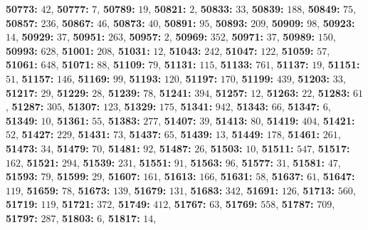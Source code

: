 \textsf{\bfseries 50773:} $42$, \textsf{\bfseries 50777:} $7$, \textsf{\bfseries 50789:} $19$, \textsf{\bfseries 50821:} $2$, \textsf{\bfseries 50833:} $33$, \textsf{\bfseries 50839:} $188$, \textsf{\bfseries 50849:} $75$, \textsf{\bfseries 50857:} $236$, \textsf{\bfseries 50867:} $46$, \textsf{\bfseries 50873:} $40$, \textsf{\bfseries 50891:} $95$, \textsf{\bfseries 50893:} $209$, \textsf{\bfseries 50909:} $98$, \textsf{\bfseries 50923:} $14$, \textsf{\bfseries 50929:} $37$, \textsf{\bfseries 50951:} $263$, \textsf{\bfseries 50957:} $2$, \textsf{\bfseries 50969:} $352$, \textsf{\bfseries 50971:} $37$, \textsf{\bfseries 50989:} $150$, \textsf{\bfseries 50993:} $628$, \textsf{\bfseries 51001:} $208$, \textsf{\bfseries 51031:} $12$, \textsf{\bfseries 51043:} $242$, \textsf{\bfseries 51047:} $122$, \textsf{\bfseries 51059:} $57$, \textsf{\bfseries 51061:} $648$, \textsf{\bfseries 51071:} $88$, \textsf{\bfseries 51109:} $79$, \textsf{\bfseries 51131:} $115$, \textsf{\bfseries 51133:} $761$, \textsf{\bfseries 51137:} $19$, \textsf{\bfseries 51151:} $51$, \textsf{\bfseries 51157:} $146$, \textsf{\bfseries 51169:} $99$, \textsf{\bfseries 51193:} $120$, \textsf{\bfseries 51197:} $170$, \textsf{\bfseries 51199:} $439$, \textsf{\bfseries 51203:} $33$, \textsf{\bfseries 51217:} $29$, \textsf{\bfseries 51229:} $28$, \textsf{\bfseries 51239:} $78$, \textsf{\bfseries 51241:} $394$, \textsf{\bfseries 51257:} $12$, \textsf{\bfseries 51263:} $22$, \textsf{\bfseries 51283:} $61$, \textsf{\bfseries 51287:} $305$, \textsf{\bfseries 51307:} $123$, \textsf{\bfseries 51329:} $175$, \textsf{\bfseries 51341:} $942$, \textsf{\bfseries 51343:} $66$, \textsf{\bfseries 51347:} $6$, \textsf{\bfseries 51349:} $10$, \textsf{\bfseries 51361:} $55$, \textsf{\bfseries 51383:} $277$, \textsf{\bfseries 51407:} $39$, \textsf{\bfseries 51413:} $80$, \textsf{\bfseries 51419:} $404$, \textsf{\bfseries 51421:} $52$, \textsf{\bfseries 51427:} $229$, \textsf{\bfseries 51431:} $73$, \textsf{\bfseries 51437:} $65$, \textsf{\bfseries 51439:} $13$, \textsf{\bfseries 51449:} $178$, \textsf{\bfseries 51461:} $261$, \textsf{\bfseries 51473:} $34$, \textsf{\bfseries 51479:} $70$, \textsf{\bfseries 51481:} $92$, \textsf{\bfseries 51487:} $26$, \textsf{\bfseries 51503:} $10$, \textsf{\bfseries 51511:} $547$, \textsf{\bfseries 51517:} $162$, \textsf{\bfseries 51521:} $294$, \textsf{\bfseries 51539:} $231$, \textsf{\bfseries 51551:} $91$, \textsf{\bfseries 51563:} $96$, \textsf{\bfseries 51577:} $31$, \textsf{\bfseries 51581:} $47$, \textsf{\bfseries 51593:} $79$, \textsf{\bfseries 51599:} $29$, \textsf{\bfseries 51607:} $161$, \textsf{\bfseries 51613:} $166$, \textsf{\bfseries 51631:} $58$, \textsf{\bfseries 51637:} $61$, \textsf{\bfseries 51647:} $119$, \textsf{\bfseries 51659:} $78$, \textsf{\bfseries 51673:} $139$, \textsf{\bfseries 51679:} $131$, \textsf{\bfseries 51683:} $342$, \textsf{\bfseries 51691:} $126$, \textsf{\bfseries 51713:} $560$, \textsf{\bfseries 51719:} $119$, \textsf{\bfseries 51721:} $372$, \textsf{\bfseries 51749:} $412$, \textsf{\bfseries 51767:} $63$, \textsf{\bfseries 51769:} $558$, \textsf{\bfseries 51787:} $709$, \textsf{\bfseries 51797:} $287$, \textsf{\bfseries 51803:} $6$, \textsf{\bfseries 51817:} $14$, 
